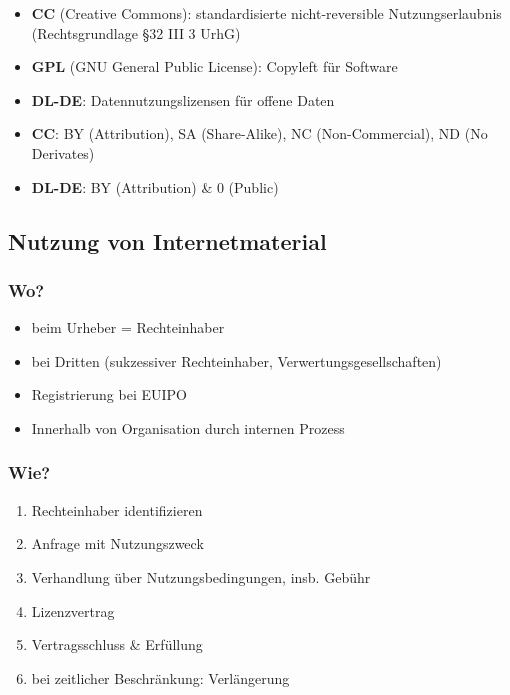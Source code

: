 \documentclass{article}
\begin{document}
\begin{itemize}
  \item \textbf{CC} (Creative Commons): standardisierte nicht-reversible Nutzungserlaubnis (Rechtsgrundlage §32 III 3 UrhG)
  \item \textbf{GPL} (GNU General Public License): Copyleft für Software
  \item \textbf{DL-DE}: Datennutzungslizensen für offene Daten
\end{itemize}

\begin{itemize}
  \item \textbf{CC}: BY (Attribution), SA (Share-Alike), NC (Non-Commercial), ND (No Derivates)
  \item \textbf{DL-DE}: BY (Attribution) \& 0 (Public)
\end{itemize}

\subsection{Nutzung von Internetmaterial}
\subsubsection{Wo?}
\begin{itemize}
  \item beim Urheber = Rechteinhaber
  \item bei Dritten (sukzessiver Rechteinhaber, Verwertungsgesellschaften)
  \item Registrierung bei EUIPO
  \item Innerhalb von Organisation durch internen Prozess
\end{itemize}

\subsubsection{Wie?}
\begin{enumerate}
  \item Rechteinhaber identifizieren
  \item Anfrage mit Nutzungszweck
  \item Verhandlung über Nutzungsbedingungen, insb. Gebühr
  \item Lizenzvertrag
  \item Vertragsschluss \& Erfüllung
  \item bei zeitlicher Beschränkung: Verlängerung
\end{enumerate}
\end{document}
